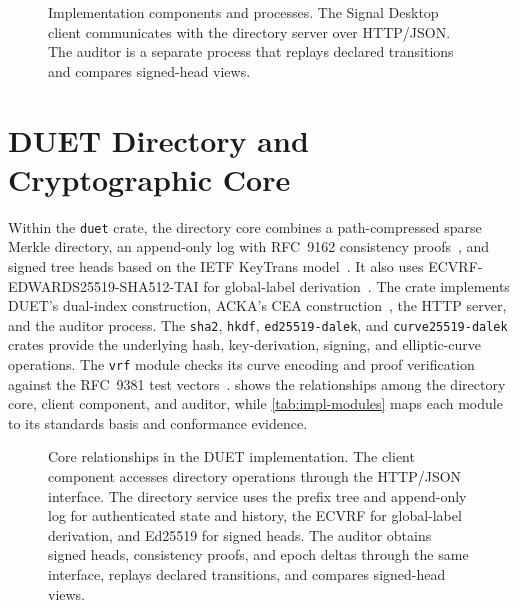 \begin{figure}[t]
\centering

\caption[Implementation components and processes.]{Implementation components and processes. The Signal
Desktop client communicates with the directory server over HTTP/JSON. The auditor is a separate
process that replays declared transitions and compares signed-head views.}
\label{fig:impl-overview}
\end{figure}
\FloatBarrier

\section{DUET Directory and Cryptographic Core}\label{sec:impl-modules}

Within the \texttt{duet} crate, the directory core combines a path-compressed sparse Merkle
directory, an append-only log with RFC~9162 consistency proofs~\cite{rfc9162}, and signed tree heads based on
the IETF KeyTrans model~\cite{ietf-keytrans-protocol}. It also uses
ECVRF-EDWARDS25519-SHA512-TAI for global-label
derivation~\cite{rfc9381}. The crate implements DUET's dual-index construction, ACKA's
CEA construction~\cite[Section~5.1]{dowling2023acka}, the HTTP server, and the auditor process. The
\texttt{sha2}, \texttt{hkdf}, \texttt{ed25519-dalek}, and \texttt{curve25519-dalek} crates provide
the underlying hash, key-derivation, signing, and elliptic-curve operations. The \texttt{vrf} module
checks its curve encoding and proof verification against the RFC~9381 test
vectors~\cite[Appendix~B.3]{rfc9381}.  shows the relationships among the
directory core, client component, and auditor, while \cref{tab:impl-modules} maps each module to its
standards basis and conformance evidence.

\begin{figure}[ht]
\centering

\caption[Core relationships in the DUET implementation.]{Core relationships in the DUET
implementation. The client component accesses directory operations through the HTTP/JSON interface.
The directory service uses the prefix tree and append-only log for authenticated state and history,
the ECVRF for global-label derivation, and Ed25519 for signed heads. The auditor obtains signed
heads, consistency proofs, and epoch deltas through the same interface, replays declared
transitions, and compares signed-head views.}
\label{fig:impl-modules}
\end{figure}

